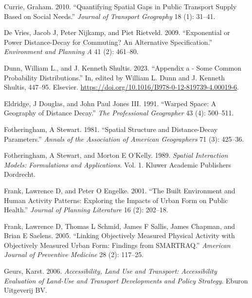 \documentclass[preprint, 3p,
authoryear]{elsarticle} %
\newlength{\cslhangindent}
\newlength{\cslentryspacingunit} %
\newenvironment{CSLReferences}[2] %
 {%
  \setlength{\parindent}{0pt}
  \ifodd #1
  \let\oldpar\par
  \def\par{\hangindent=\cslhangindent\oldpar}
  \fi
  \setlength{\parskip}{#2\cslentryspacingunit}
 }%
 {}
\begin{document}
\begin{CSLReferences}{1}{0}
\leavevmode{}%
Currie, Graham. 2010. {``Quantifying Spatial Gaps in Public Transport
Supply Based on Social Needs.''} \emph{Journal of Transport Geography}
18 (1): 31--41.

\leavevmode{}%
De Vries, Jacob J, Peter Nijkamp, and Piet Rietveld. 2009.
{``Exponential or Power Distance-Decay for Commuting? An Alternative
Specification.''} \emph{Environment and Planning A} 41 (2): 461--80.

\leavevmode{}%
Dunn, William L., and J. Kenneth Shultis. 2023. {``Appendix a - Some
Common Probability Distributions.''} In, edited by William L. Dunn and
J. Kenneth Shultis, 447--95. Elsevier.
\url{https://doi.org/10.1016/B978-0-12-819739-4.00019-6}.

\leavevmode{}%
Eldridge, J Douglas, and John Paul Jones III. 1991. {``Warped Space: A
Geography of Distance Decay.''} \emph{The Professional Geographer} 43
(4): 500--511.

\leavevmode{}%
Fotheringham, A Stewart. 1981. {``Spatial Structure and Distance-Decay
Parameters.''} \emph{Annals of the Association of American Geographers}
71 (3): 425--36.

\leavevmode{}%
Fotheringham, A Stewart, and Morton E O'Kelly. 1989. \emph{Spatial
Interaction Models: Formulations and Applications}. Vol. 1. Kluwer
Academic Publishers Dordrecht.

\leavevmode{}%
Frank, Lawrence D, and Peter O Engelke. 2001. {``The Built Environment
and Human Activity Patterns: Exploring the Impacts of Urban Form on
Public Health.''} \emph{Journal of Planning Literature} 16 (2): 202--18.

\leavevmode{}%
Frank, Lawrence D, Thomas L Schmid, James F Sallis, James Chapman, and
Brian E Saelens. 2005. {``Linking Objectively Measured Physical Activity
with Objectively Measured Urban Form: Findings from SMARTRAQ.''}
\emph{American Journal of Preventive Medicine} 28 (2): 117--25.

\leavevmode{}%
Geurs, Karst. 2006. \emph{Accessibility, Land Use and Transport:
Accessibility Evaluation of Land-Use and Transport Developments and
Policy Strategy}. Eburon Uitgeverij BV.


\end{CSLReferences}
\end{document}
